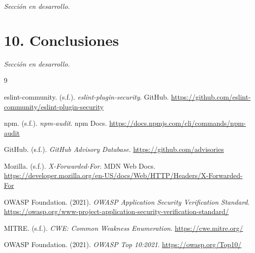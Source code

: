 \documentclass[12pt, letterpaper]{article}
\begin{document}
\textit{Sección en desarrollo.}

\section{10. Conclusiones}

\textit{Sección en desarrollo.}

\newpage
\begin{thebibliography}{9}
\setlength{\itemsep}{5pt}

 eslint-community. (s.f.). \textit{eslint-plugin-security}. GitHub. \url{https://github.com/eslint-community/eslint-plugin-security}

 npm. (s.f.). \textit{npm-audit}. npm Docs. \url{https://docs.npmjs.com/cli/commands/npm-audit}

 GitHub. (s.f.). \textit{GitHub Advisory Database}. \url{https://github.com/advisories}

 Mozilla. (s.f.). \textit{X-Forwarded-For}. MDN Web Docs. \url{https://developer.mozilla.org/en-US/docs/Web/HTTP/Headers/X-Forwarded-For}

 OWASP Foundation. (2021). \textit{OWASP Application Security Verification Standard}. \url{https://owasp.org/www-project-application-security-verification-standard/}

 MITRE. (s.f.). \textit{CWE: Common Weakness Enumeration}. \url{https://cwe.mitre.org/}

 OWASP Foundation. (2021). \textit{OWASP Top 10:2021}. \url{https://owasp.org/Top10/}

\end{thebibliography}
\end{document}
